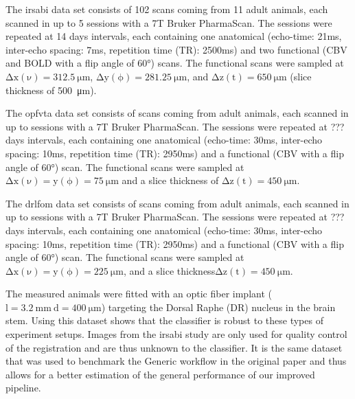 The irsabi data set consists of 102 scans coming from 11 adult animals, each scanned in up to 5 sessions with a 7T Bruker PharmaScan.
The sessions were repeated at 14 days intervals, each containing one anatomical (echo-time: 21ms, inter-echo spacing: 7ms, repetition time (TR): 2500ms) and two functional (CBV and BOLD with a flip angle of 60°) scans.
The functional scans were sampled at $\mathrm{\Delta x(\nu)=\SI{312.5}{\micro\meter}}$, $\mathrm{\Delta y(\phi)=\SI{281.25}{\micro\meter}}$, and $\mathrm{\Delta z(t)=\SI{650}{\micro\meter}}$ (slice thickness of \SI{500}{\micro\meter}).

The opfvta data set consists of  scans coming from  adult animals, each scanned in up to  sessions with a 7T Bruker PharmaScan.
The sessions were repeated at ??? days intervals, each containing one anatomical (echo-time: 30ms, inter-echo spacing: 10ms, repetition time (TR): 2950ms) and a functional (CBV with a flip angle of 60°) scan.
The functional scans were sampled at $\mathrm{\Delta x(\nu)=y(\phi)=\SI{75}{\micro\meter}}$ and a slice thickness of $\mathrm{\Delta z(t)=\SI{450}{\micro\meter}}$.

The drlfom data set consists of  scans coming from  adult animals, each scanned in up to  sessions with a 7T Bruker PharmaScan.
The sessions were repeated at ??? days intervals, each containing one anatomical (echo-time: 30ms, inter-echo spacing: 10ms, repetition time (TR): 2950ms) and a functional (CBV with a flip angle of 60°) scan.
The functional scans were sampled at $\mathrm{\Delta x(\nu)=y(\phi)=\SI{225}{\micro\meter}}$, and a slice thickness$\mathrm{\Delta z(t)=\SI{450}{\micro\meter}}$.

The measured animals were fitted with an optic fiber implant ($\mathrm{l=\SI{3.2}{\milli\meter} \ d=\SI{400}{\micro\meter}}$) targeting the Dorsal Raphe (DR) nucleus in the brain stem.
Using this dataset shows that the classifier is robust to these types of experiment setups.
Images from the irsabi study are only used for quality control of the registration and are thus unknown to the classifier.
It is the same dataset that was used to benchmark the Generic workflow in the original paper and thus allows for a better estimation of the general performance of our improved pipeline.

